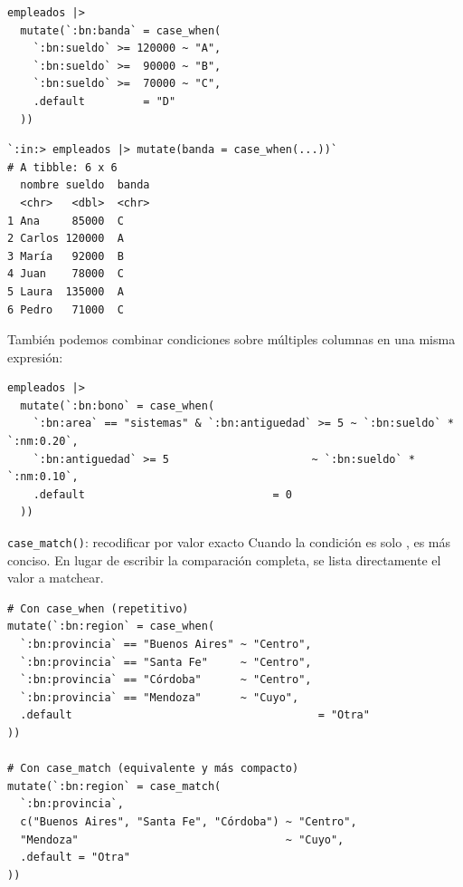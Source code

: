 \documentclass[8pt]{beamer}
\begin{document}
	\begin{frame}[fragile]
\begin{lstlisting}[style=RScript]
empleados |>
  mutate(`:bn:banda` = case_when(
    `:bn:sueldo` >= 120000 ~ "A",
    `:bn:sueldo` >=  90000 ~ "B",
    `:bn:sueldo` >=  70000 ~ "C",
    .default         = "D"
  ))
\end{lstlisting}
\begin{lstlisting}[style=RConsole]
`:in:> empleados |> mutate(banda = case_when(...))`
# A tibble: 6 x 6
  nombre sueldo  banda
  <chr>   <dbl>  <chr>
1 Ana     85000  C
2 Carlos 120000  A
3 María   92000  B
4 Juan    78000  C
5 Laura  135000  A
6 Pedro   71000  C
\end{lstlisting}

		También podemos combinar condiciones sobre múltiples columnas en una misma expresión:
\begin{lstlisting}[style=RScript]
empleados |>
  mutate(`:bn:bono` = case_when(
    `:bn:area` == "sistemas" & `:bn:antiguedad` >= 5 ~ `:bn:sueldo` * `:nm:0.20`,
    `:bn:antiguedad` >= 5                      ~ `:bn:sueldo` * `:nm:0.10`,
    .default                             = 0
  ))
\end{lstlisting}
	\end{frame}


	\begin{frame}[fragile]{\texttt{case\_match()}: recodificar por valor exacto}
		Cuando la condición es solo ,  es más conciso. En lugar de escribir la comparación completa, se lista directamente el valor a matchear.

\begin{lstlisting}[style=RScript]
# Con case_when (repetitivo)
mutate(`:bn:region` = case_when(
  `:bn:provincia` == "Buenos Aires" ~ "Centro",
  `:bn:provincia` == "Santa Fe"     ~ "Centro",
  `:bn:provincia` == "Córdoba"      ~ "Centro",
  `:bn:provincia` == "Mendoza"      ~ "Cuyo",
  .default  									= "Otra"
))

# Con case_match (equivalente y más compacto)
mutate(`:bn:region` = case_match(
  `:bn:provincia`,
  c("Buenos Aires", "Santa Fe", "Córdoba") ~ "Centro",
  "Mendoza"                                ~ "Cuyo",
  .default = "Otra"
))
\end{lstlisting}
	\end{frame}
\end{document}
